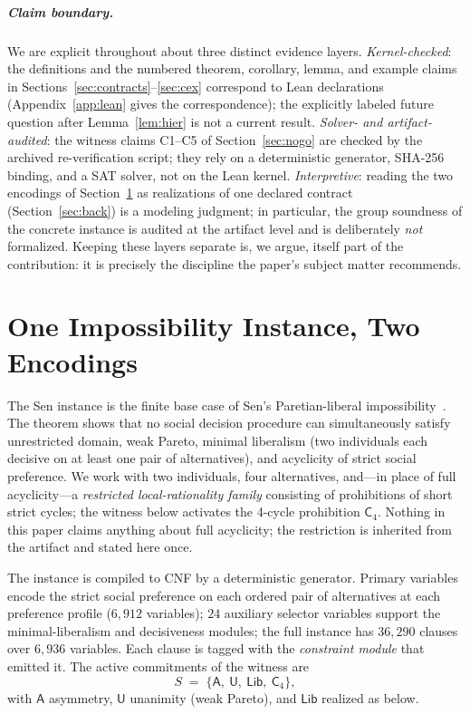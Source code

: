 \documentclass[sigplan,10pt,review,anonymous]{acmart}
\theoremstyle{acmdefinition}
\newcommand{\modsym}[1]{\mathsf{#1}}
\begin{document}
\subparagraph*{Claim boundary.} We are explicit throughout about three
distinct evidence layers. \emph{Kernel-checked}: the definitions and the
numbered theorem, corollary, lemma, and example claims in
Sections~\ref{sec:contracts}--\ref{sec:cex} correspond to Lean declarations
(Appendix~\ref{app:lean} gives the correspondence); the explicitly labeled
future question after Lemma~\ref{lem:hier} is not a current result.
\emph{Solver- and artifact-audited}: the witness claims C1--C5 of
Section~\ref{sec:nogo} are checked by the archived re-verification script;
they rely on a deterministic generator, SHA-256 binding, and a SAT solver, not
on the Lean kernel. \emph{Interpretive}: reading the two encodings of
Section~\ref{sec:instance} as realizations of one declared contract
(Section~\ref{sec:back}) is a modeling judgment; in particular, the group
soundness of the concrete instance is audited at the artifact level and is
deliberately \emph{not} formalized. Keeping these layers separate is, we
argue, itself part of the contribution: it is precisely the discipline the
paper's subject matter recommends.

\section{One Impossibility Instance, Two Encodings}
\label{sec:instance}

The Sen instance is the finite base case of Sen's
Paretian-liberal impossibility~\cite{Sen1970}. The theorem shows that no social decision procedure can
simultaneously satisfy unrestricted domain, weak Pareto, minimal liberalism
(two individuals each decisive on at least one pair of alternatives), and
acyclicity of strict social preference. We work with two individuals, four
alternatives, and---in place of full acyclicity---a
\emph{restricted local-rationality family} consisting of prohibitions of
short strict cycles; the witness below activates the 4-cycle prohibition
$\mathsf{C}_4$. Nothing in this paper claims anything about full acyclicity;
the restriction is inherited from the artifact and stated here once.

The instance is compiled to CNF by a deterministic generator. Primary
variables encode the strict social preference on each ordered pair of
alternatives at each preference profile ($6{,}912$ variables); $24$ auxiliary
selector variables support the minimal-liberalism and decisiveness modules;
the full instance has
$36{,}290$ clauses over $6{,}936$ variables. Each clause is tagged with the
\emph{constraint module} that emitted it. The active commitments of the
witness are
\[
S \;=\; \{\modsym{A},\ \modsym{U},\ \mathsf{Lib},\ \mathsf{C}_4\},
\]
with $\modsym{A}$ asymmetry, $\modsym{U}$ unanimity (weak Pareto), and
$\mathsf{Lib}$ realized as below.
\end{document}

